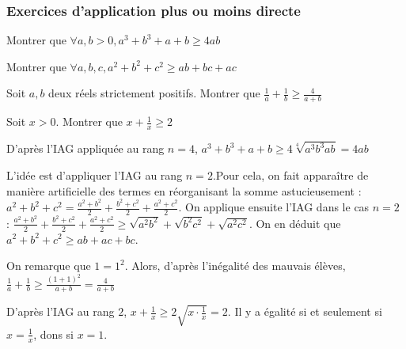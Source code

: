 \subsubsection{ Exercices d'application plus ou moins directe }

\begin{exo} Montrer que $\forall a, b >0, a^3 + b^3 + a+b \geqslant 4ab$
\end{exo}

\begin{exo} Montrer que $\forall a, b, c, a^2 + b^2+c^2 \geqslant ab+bc+ac$
\end{exo}

\begin{exo} Soit $a, b$ deux réels strictement positifs. Montrer que $\frac{1}{a} + \frac{1}{b} \geqslant \frac{4}{a+b}$
\end{exo}

\begin{exo} Soit $x>0$. Montrer que $x+\frac{1}{x} \geqslant 2$
\end{exo}


\begin{sol} D'après l'IAG appliquée au rang $n=4$, $a^3+b^3+a+b \geqslant 4\sqrt[4]{a^3b^3ab} = 4 ab $
\end{sol}

\begin{sol} L'idée est d'appliquer l'IAG au rang $n=2$.Pour cela, on fait apparaître de manière artificielle des termes en réorganisant la somme astucieusement : $a^2+b^2+c^2 = \frac{a^2+b^2}{2}+\frac{b^2+c^2}{2}+\frac{a^2+c^2}{2}$. On applique ensuite l'IAG dans le cas $n=2$ : $\frac{a^2+b^2}{2}+\frac{b^2+c^2}{2}+\frac{a^2+c^2}{2} \geqslant \sqrt{a^2b^2} + \sqrt{b^2c^2} + \sqrt{a^2c^2}$. On en déduit que $a^2+b^2+c^2 \geqslant ab+ac+bc$.
\end{sol}

\begin{sol} On remarque que $1 = 1^2$. Alors, d'après l'inégalité des mauvais élèves, \\ $\frac{1}{a} + \frac{1}{b} \geqslant \frac{(1+1)^2}{a+b} = \frac{4}{a+b}$
\end{sol}

\begin{sol} D'après l'IAG au rang $2$, $x+\frac{1}{x} \geqslant 2 \sqrt{x \cdot \frac{1}{x}} = 2$. Il y a égalité si et seulement si $x=\frac{1}{x}$, dons si $x=1$.
\end{sol}
